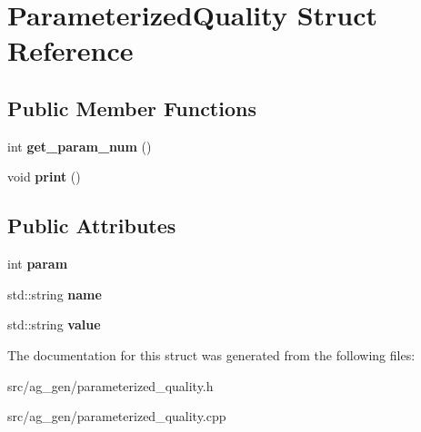 \hypertarget{struct_parameterized_quality}{}\section{Parameterized\+Quality Struct Reference}
\label{struct_parameterized_quality}
\subsection*{Public Member Functions}
\begin{DoxyCompactItemize}
\item 
\mbox{\label{struct_parameterized_quality_a2a240ab18ff1bdc683e7190b880b2e3f}} 
int {\bfseries get\+\_\+param\+\_\+num} ()
\item 
\mbox{\label{struct_parameterized_quality_ae9c8b5e97bac869232094bb2b42ab437}} 
void {\bfseries print} ()
\end{DoxyCompactItemize}
\subsection*{Public Attributes}
\begin{DoxyCompactItemize}
\item 
\mbox{\label{struct_parameterized_quality_a3f645eec66a463f0c16d22d85785235c}} 
int {\bfseries param}
\item 
\mbox{\label{struct_parameterized_quality_a041debe48f84184b94175c1e14ea755f}} 
std\+::string {\bfseries name}
\item 
\mbox{\label{struct_parameterized_quality_ae169312cf2a4390fa5679e2725e8d7b3}} 
std\+::string {\bfseries value}
\end{DoxyCompactItemize}


The documentation for this struct was generated from the following files\+:\begin{DoxyCompactItemize}
\item 
src/ag\+\_\+gen/parameterized\+\_\+quality.\+h\item 
src/ag\+\_\+gen/parameterized\+\_\+quality.\+cpp\end{DoxyCompactItemize}
